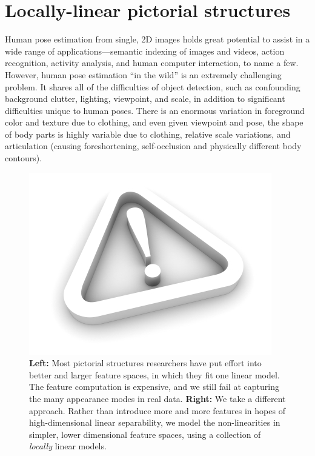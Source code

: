 \chapter{Locally-linear pictorial structures}
Human pose estimation from single, 2D images holds great potential to assist in 
a wide range of applications---semantic indexing of images and videos, action 
recognition, activity analysis, and human computer interaction, to name a few.
However, human pose estimation ``in the wild'' is an extremely challenging 
problem.  It shares all of the difficulties of object detection, such as 
confounding background clutter, lighting, viewpoint, and scale, in addition to
significant difficulties unique to human poses.  There is an enormous 
variation in foreground color and texture due to clothing, and even given 
viewpoint and pose, the shape of body parts is highly variable due to clothing, 
relative scale variations, and articulation (causing foreshortening, 
self-occlusion and physically different body contours).

\begin{figure}[t!]
\centering
\includegraphics[width=0.99\linewidth]{figs/empty.jpg}
\caption{\small \label{fig:overview} \textbf{Left:} Most pictorial structures 
researchers have put effort into better and larger feature spaces, in which 
they fit one linear model.  The feature computation is expensive, and we still 
fail at capturing the many appearance modes in real data.  \textbf{Right:} We 
take a different approach.  Rather than introduce more and more features in 
hopes of high-dimensional linear separability, we model the non-linearities in 
simpler, lower dimensional feature spaces, using a collection of {\em locally} 
linear models.}
\end{figure}


